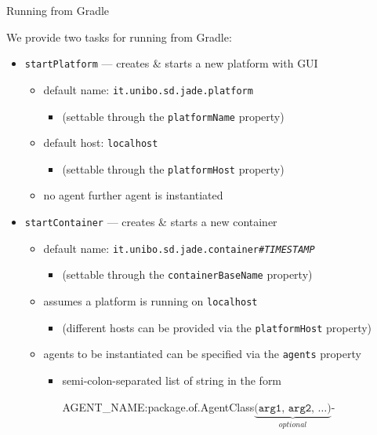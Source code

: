 \documentclass{beamer}\mode<presentation>{\usetheme{AMSCesenaPurpleAndGold}}
\begin{document}
\begin{frame}{Running \jade{} from Gradle}
    
    We provide two tasks for running \jade{} from Gradle:
    \vfill
    \begin{itemize}
    	\item \alert{\texttt{startPlatform}} --- creates \& starts a new platform with GUI
    	\begin{itemize}
    		\item default name: \texttt{it.unibo.sd.jade.platform}
    		\begin{itemize}
				\item (settable through the \texttt{platformName} property)
    		\end{itemize}
    	
    		\item default host: \texttt{localhost}
    		\begin{itemize}
    			\item (settable through the \texttt{platformHost} property)
    		\end{itemize}
    	
    		\item \alert{no agent} further agent is instantiated
    	\end{itemize}
    
    	\vfill
    	
	    \item \alert{\texttt{startContainer}} --- creates \& starts a new container 
	    \begin{itemize}
	    	
	    	\item default name: \texttt{it.unibo.sd.jade.container\#\textit{TIMESTAMP}}
	    	\begin{itemize}
	    		\item (settable through the \texttt{containerBaseName} property)
	    	\end{itemize}
	    	
	    	\item assumes a platform is running on \texttt{localhost}
	    	\begin{itemize}
	    		\item (different hosts can be provided via the \texttt{platformHost} property)
	    	\end{itemize}
    	
    		\item agents to be instantiated can be specified via the \alert{\texttt{agents}} property 
    		\begin{itemize}
    			\item semi-colon-separated list of string in the form
    			\begin{center}\ttfamily
    				AGENT\_NAME\alert{:}package.of.AgentClass$\underbrace{\texttt{(arg1, arg2, \ldots)}}_{optional}$-
    			\end{center}
    		\end{itemize}
	    \end{itemize}
    \end{itemize}


\end{frame}
\end{document}
